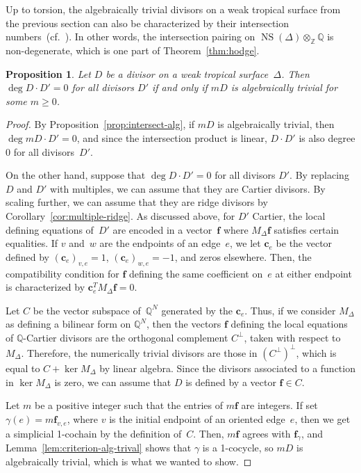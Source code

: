 \documentclass[11pt]{amsart}
\newtheorem{prop}[thm]{Proposition}
\theoremstyle{definition}
\newcommand{\bff}{\mathbf f}
\newcommand{\NS}{\operatorname{NS}}
\newcommand{\QQ}{\mathbb Q}
\newcommand{\ZZ}{\mathbb Z}
\begin{document}
Up to torsion, the algebraically trivial divisors on a weak tropical surface
from the previous section can also be characterized by their intersection
numbers~(cf.\ \cite[19.3.1(ii)]{fulton-intersection}). In other words, the
intersection pairing on $\NS(\Delta) \otimes_{\ZZ} \QQ$ is non-degenerate, which
is one part of Theorem~\ref{thm:hodge}.

\begin{prop}\label{prop:numerical-algebraic}
Let $D$ be a divisor on a weak tropical surface~$\Delta$. Then $\deg D \cdot D'
= 0$ for all divisors $D'$ if and only if $mD$ is algebraically trivial for
some $m \geq 0$.
\end{prop}

\begin{proof}
By Proposition~\ref{prop:intersect-alg}, if $mD$ is algebraically trivial, then
$\deg mD \cdot D'  = 0$, and since the intersection product is linear, $D \cdot
D'$ is also degree $0$ for all divisors~$D'$.

On the other hand, suppose that $\deg D \cdot D' = 0$ for all divisors $D'$. By
replacing $D$ and $D'$ with multiples, we can assume that they are Cartier
divisors. By scaling further, we can assume that they are ridge divisors by
Corollary~\ref{cor:multiple-ridge}.
As discussed above, for $D'$ Cartier, the local defining equations of~$D'$ are
encoded in a vector~$\bff$ where $M_\Delta \bff$ satisfies certain equalities.
If $v$ and~$w$ are the endpoints of an edge~$e$, we
let $\mathbf c_e$ be the vector defined by $(\mathbf c_e)_{v,e} = 1$,
$(\mathbf c_e)_{w,e} = -1$, and zeros elsewhere. Then, the compatibility
condition for $\bff$ defining the same coefficient on~$e$ at either endpoint is
characterized by $\mathbf c_e^T M_\Delta \bff = 0$.

Let $C$ be the vector subspace of~$\QQ^N$ generated by the $\mathbf c_e$. Thus,
if we consider $M_{\Delta}$ as defining a bilinear form on $\QQ^N$, then the
vectors $\bff$ defining the local equations of $\QQ$-Cartier divisors are the
orthogonal complement $C^{\perp}$, taken with respect to $M_{\Delta}$.
Therefore, the numerically trivial divisors are those in $(C^\perp)^{\perp}$,
which is equal to $C + \ker M_{\Delta}$ by linear algebra. Since the divisors
associated to a function in $\ker M_{\Delta}$ is zero, we can assume that $D$ is
defined by a vector $\bff \in C$.

Let $m$ be a positive integer such that the entries of $m\bff$ are integers. If
set $\gamma(e) = m\bff_{v,e}$, where $v$ is the initial endpoint of an oriented
edge~$e$, then we get a simplicial 1-cochain by the definition of~$C$. Then, $m
\bff$ agrees with $\bff_{\gamma}$, and Lemma~\ref{lem:criterion-alg-trival}
shows that $\gamma$ is a 1-cocycle, so $mD$ is algebraically trivial, which is
what we wanted to show.
\end{proof}
\end{document}
